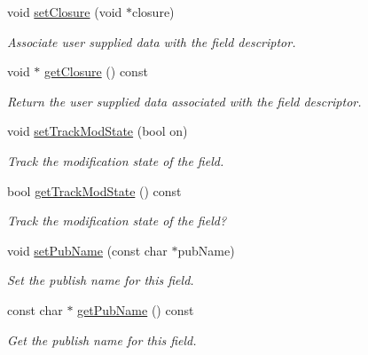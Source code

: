 \begin{DoxyCompactItemize}
void \hyperlink{classWombat_1_1MamaFieldDescriptor_aec2dcca9943ce8f387ca6aafa97e89ec}{setClosure} (void $\ast$closure)
\begin{DoxyCompactList}\small\item\em Associate user supplied data with the field descriptor. \item\end{DoxyCompactList}\item 
void $\ast$ \hyperlink{classWombat_1_1MamaFieldDescriptor_ad11ddda5a1c9133ad00401ef3fe8aedd}{getClosure} () const 
\begin{DoxyCompactList}\small\item\em Return the user supplied data associated with the field descriptor. \item\end{DoxyCompactList}\item 
void \hyperlink{classWombat_1_1MamaFieldDescriptor_a295210e0265a662fea3967fcbac4d674}{setTrackModState} (bool on)
\begin{DoxyCompactList}\small\item\em Track the modification state of the field. \item\end{DoxyCompactList}\item 
bool \hyperlink{classWombat_1_1MamaFieldDescriptor_a50225e51ecace29ece3907796c38615f}{getTrackModState} () const 
\begin{DoxyCompactList}\small\item\em Track the modification state of the field? \item\end{DoxyCompactList}\item 
void \hyperlink{classWombat_1_1MamaFieldDescriptor_a58f48b3c9ad1d7b56f663089c5dba395}{setPubName} (const char $\ast$pubName)
\begin{DoxyCompactList}\small\item\em Set the publish name for this field. \item\end{DoxyCompactList}\item 
const char $\ast$ \hyperlink{classWombat_1_1MamaFieldDescriptor_acb20f166bf1e0280a82943bf6e6234fd}{getPubName} () const 
\begin{DoxyCompactList}\small\item\em Get the publish name for this field. \item\end{DoxyCompactList}\end{DoxyCompactItemize}
